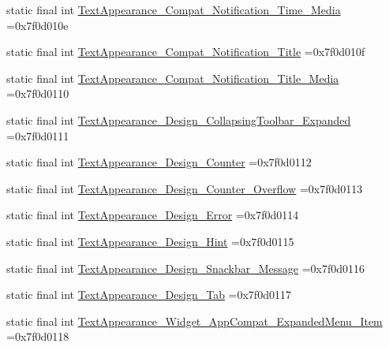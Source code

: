 \begin{DoxyCompactItemize}
static final int \mbox{\hyperlink{classbr_1_1unb_1_1cic_1_1mp_1_1marketmaster_1_1R_1_1style_a796efb503690bfe1e75e35e1f5b27b78}{Text\+Appearance\+\_\+\+Compat\+\_\+\+Notification\+\_\+\+Time\+\_\+\+Media}} =0x7f0d010e
\item 
static final int \mbox{\hyperlink{classbr_1_1unb_1_1cic_1_1mp_1_1marketmaster_1_1R_1_1style_a155611b61fc98967e95e36a9ef199b60}{Text\+Appearance\+\_\+\+Compat\+\_\+\+Notification\+\_\+\+Title}} =0x7f0d010f
\item 
static final int \mbox{\hyperlink{classbr_1_1unb_1_1cic_1_1mp_1_1marketmaster_1_1R_1_1style_aabefcbde30d91997a100068ef2fd66b6}{Text\+Appearance\+\_\+\+Compat\+\_\+\+Notification\+\_\+\+Title\+\_\+\+Media}} =0x7f0d0110
\item 
static final int \mbox{\hyperlink{classbr_1_1unb_1_1cic_1_1mp_1_1marketmaster_1_1R_1_1style_a6988c7e4712de6831a96c7630d0af9c7}{Text\+Appearance\+\_\+\+Design\+\_\+\+Collapsing\+Toolbar\+\_\+\+Expanded}} =0x7f0d0111
\item 
static final int \mbox{\hyperlink{classbr_1_1unb_1_1cic_1_1mp_1_1marketmaster_1_1R_1_1style_a5c8e16b94a44a67b3809e4eafa8ce3ca}{Text\+Appearance\+\_\+\+Design\+\_\+\+Counter}} =0x7f0d0112
\item 
static final int \mbox{\hyperlink{classbr_1_1unb_1_1cic_1_1mp_1_1marketmaster_1_1R_1_1style_a0eff1ac1a07d6dd97fd46bc00ffedf2d}{Text\+Appearance\+\_\+\+Design\+\_\+\+Counter\+\_\+\+Overflow}} =0x7f0d0113
\item 
static final int \mbox{\hyperlink{classbr_1_1unb_1_1cic_1_1mp_1_1marketmaster_1_1R_1_1style_a14347d45c5a1e0edda2b1c04720ec01b}{Text\+Appearance\+\_\+\+Design\+\_\+\+Error}} =0x7f0d0114
\item 
static final int \mbox{\hyperlink{classbr_1_1unb_1_1cic_1_1mp_1_1marketmaster_1_1R_1_1style_a05a14d53d3462568156b35d9745b83ec}{Text\+Appearance\+\_\+\+Design\+\_\+\+Hint}} =0x7f0d0115
\item 
static final int \mbox{\hyperlink{classbr_1_1unb_1_1cic_1_1mp_1_1marketmaster_1_1R_1_1style_a135ed97b65bbbaffa183167aa573303d}{Text\+Appearance\+\_\+\+Design\+\_\+\+Snackbar\+\_\+\+Message}} =0x7f0d0116
\item 
static final int \mbox{\hyperlink{classbr_1_1unb_1_1cic_1_1mp_1_1marketmaster_1_1R_1_1style_aedb0ab6aa7c7f110d7d5287668617509}{Text\+Appearance\+\_\+\+Design\+\_\+\+Tab}} =0x7f0d0117
\item 
static final int \mbox{\hyperlink{classbr_1_1unb_1_1cic_1_1mp_1_1marketmaster_1_1R_1_1style_a7c8f5ab390592b60f75f283a2d970a97}{Text\+Appearance\+\_\+\+Widget\+\_\+\+App\+Compat\+\_\+\+Expanded\+Menu\+\_\+\+Item}} =0x7f0d0118

\end{DoxyCompactItemize}
